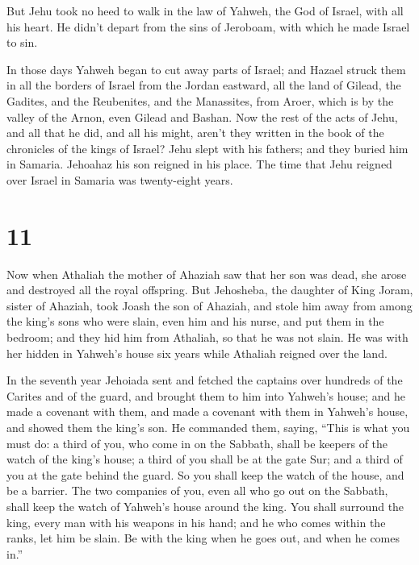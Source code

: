  But Jehu took no heed to walk in the law of Yahweh, the
God of Israel, with all his heart. He didn't depart from the sins of
Jeroboam, with which he made Israel to sin.

 In those days Yahweh began to cut away parts of Israel;
and Hazael struck them in all the borders of Israel  from
the Jordan eastward, all the land of Gilead, the Gadites, and the
Reubenites, and the Manassites, from Aroer, which is by the valley of
the Arnon, even Gilead and Bashan.  Now the rest of the
acts of Jehu, and all that he did, and all his might, aren't they
written in the book of the chronicles of the kings of Israel?
 Jehu slept with his fathers; and they buried him in
Samaria. Jehoahaz his son reigned in his place.  The time
that Jehu reigned over Israel in Samaria was twenty-eight years.

\hypertarget{section-10}{%
\section{11}\label{section-10}}

 Now when Athaliah the mother of Ahaziah saw that her son
was dead, she arose and destroyed all the royal offspring.
 But Jehosheba, the daughter of King Joram, sister of
Ahaziah, took Joash the son of Ahaziah, and stole him away from among
the king's sons who were slain, even him and his nurse, and put them in
the bedroom; and they hid him from Athaliah, so that he was not slain.
 He was with her hidden in Yahweh's house six years while
Athaliah reigned over the land.

 In the seventh year Jehoiada sent and fetched the
captains over hundreds of the Carites and of the guard, and brought them
to him into Yahweh's house; and he made a covenant with them, and made a
covenant with them in Yahweh's house, and showed them the king's son.
 He commanded them, saying, ``This is what you must do: a
third of you, who come in on the Sabbath, shall be keepers of the watch
of the king's house;  a third of you shall be at the gate
Sur; and a third of you at the gate behind the guard. So you shall keep
the watch of the house, and be a barrier.  The two
companies of you, even all who go out on the Sabbath, shall keep the
watch of Yahweh's house around the king.  You shall
surround the king, every man with his weapons in his hand; and he who
comes within the ranks, let him be slain. Be with the king when he goes
out, and when he comes in.''

